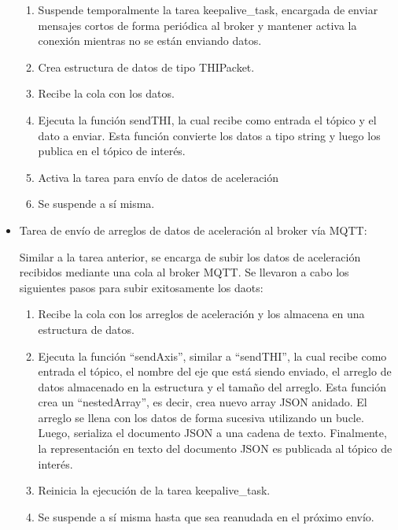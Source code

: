 \begin{itemize}
    \begin{enumerate}
        \item Suspende temporalmente la tarea keepalive\_task, encargada de enviar mensajes cortos de forma periódica al broker y mantener activa la conexión mientras no se están enviando datos.
        \item Crea estructura de datos de tipo THIPacket.
        \item Recibe la cola con los datos.
        \item Ejecuta la función sendTHI, la cual recibe como entrada el tópico y el dato a enviar. Esta función convierte los datos a tipo string y luego los publica en el tópico de interés.
        \item Activa la tarea para envío de datos de aceleración
        \item Se suspende a sí misma.
    \end{enumerate}
    
    \item Tarea de envío de arreglos de datos de aceleración al broker vía MQTT:
    
    Similar a la tarea anterior, se encarga de subir los datos de aceleración recibidos mediante una cola al broker MQTT. Se llevaron a cabo los siguientes pasos para subir exitosamente los daots:

    \begin{enumerate}
        \item Recibe la cola con los arreglos de aceleración y los almacena en una estructura de datos.
        \item Ejecuta la función ``sendAxis'', similar a ``sendTHI'', la cual recibe como entrada el tópico, el nombre del eje que está siendo enviado, el arreglo de datos almacenado en la estructura y el tamaño del arreglo. Esta función crea un ``nestedArray'', es decir, crea nuevo array JSON anidado. El arreglo se llena con los datos de forma sucesiva utilizando un bucle. Luego, serializa el documento JSON a una cadena de texto. Finalmente, la representación en texto del documento JSON es publicada al tópico de interés.
        \item Reinicia la ejecución de la tarea keepalive\_task.
        \item Se suspende a sí misma hasta que sea reanudada en el próximo envío.
    \end{enumerate}
    
\end{itemize}

